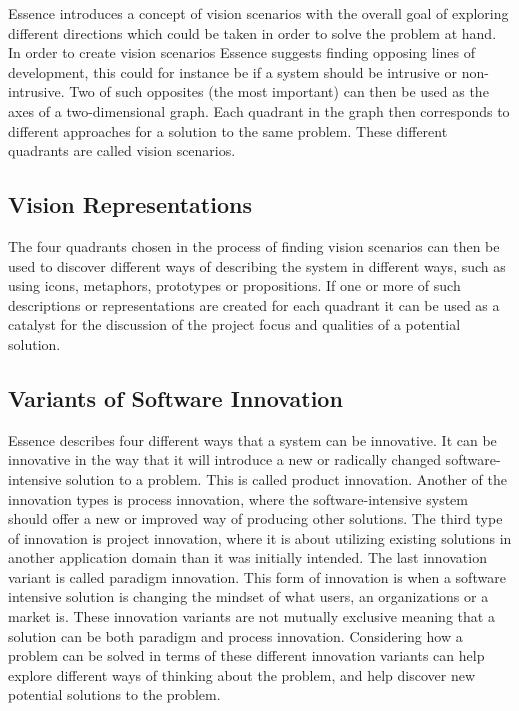 Essence introduces a concept of vision scenarios with the overall goal of exploring different directions which could be taken in order to solve the problem at hand. In order to create vision scenarios Essence suggests finding opposing lines of development, this could for instance be if a system should be intrusive or non-intrusive. Two of such opposites (the most important) can then be used as the axes of a two-dimensional graph. Each quadrant in the graph then corresponds to different approaches for a solution to the same problem. These different quadrants are called vision scenarios.

\subsection{Vision Representations}
\label{sub:vision_representations}

The four quadrants chosen in the process of finding vision scenarios can then be used to discover different ways of describing the system in different ways, such as using icons, metaphors, prototypes or propositions. If one or more of such descriptions or representations are created for each quadrant it can be used as a catalyst for the discussion of the project focus and qualities of a potential solution. 

\subsection{Variants of Software Innovation}
\label{sub:essence_innovation_variants}

Essence describes four different ways that a system can be innovative. It can be innovative in the way that it will introduce a new or radically changed software-intensive solution to a problem. This is called product innovation. Another of the innovation types is process innovation, where the software-intensive system should offer a new or improved way of producing other solutions. The third type of innovation is project innovation, where it is about utilizing existing solutions in another application domain than it was initially intended. The last innovation variant is called paradigm innovation. This form of innovation is when a software intensive solution is changing the mindset of what users, an organizations or a market is. These innovation variants are not mutually exclusive meaning that a solution can be both paradigm and process innovation. Considering how a problem can be solved in terms of these different innovation variants can help explore different ways of thinking about the problem, and help discover new potential solutions to the problem.

